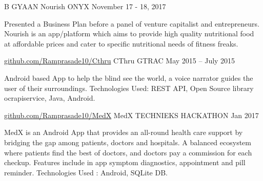 \begin{cventries}
  \cventry
    {B GYAAN} %
    {Nourish} %
    {ONYX} %
    {November 17 - 18, 2017} %
    {
      \begin{cvitems} %
        \item {Presented a Business Plan before a panel of venture capitalist and entrepreneurs.
Nourish is an app/platform which aims to provide high quality nutritional food at affordable prices and cater to specific nutritional needs of fitness freaks.}
      \end{cvitems}
    }
  \cventry
    {\href{https://github.com/Ramprasade10/Cthru}{github.com/Ramprasade10/Cthru}} %
    {CThru} %
    {GTRAC} %
    {May 2015 – July 2015} %
    {
      \begin{cvitems} %
        \item {Android based App to help the blind see the world, a voice narrator guides the user of their surroundings.\newline{}
Technologies Used: REST API, Open Source library ocrapiservice, Java, Android.}
      \end{cvitems}
    }

  \cventry
    {\href{https://github.com/Ramprasade10/MedX}{github.com/Ramprasade10/MedX}} %
    {MedX} %
    {TECHNIEKS HACKATHON} %
    {Jan 2017} %
    {
      \begin{cvitems} %
        \item {MedX is an Android App that provides an all-round health care support by bridging the gap among patients, doctors and hospitals. A balanced ecosystem where patients find the best of doctors, and doctors pay a commission for each checkup. Features include in app symptom diagnostics, appointment and pill reminder.\newline{}
Technologies Used : Android, SQLite DB.}
      \end{cvitems}
    }

\end{cventries}
